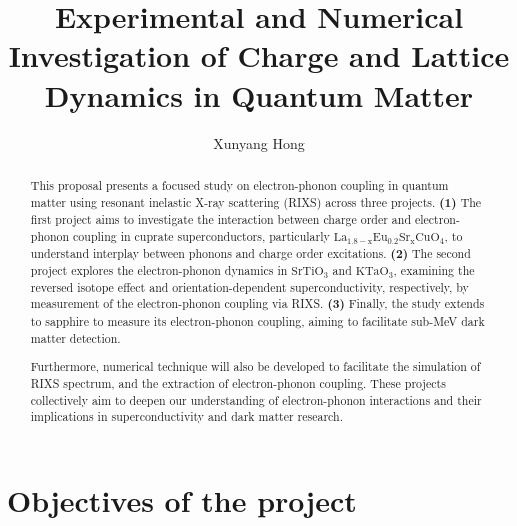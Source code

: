 \documentclass[11pt]{article}
\begin{document}
\title{Experimental and Numerical Investigation of Charge and Lattice Dynamics in Quantum Matter}
\author{Xunyang Hong}
\date{}
\maketitle





\begin{abstract}
This proposal presents a focused study on electron-phonon coupling in quantum matter using resonant inelastic X-ray scattering (RIXS) across three projects. \textbf{(1)} The first project aims to investigate the interaction between charge order and electron-phonon coupling in cuprate superconductors, particularly $\mathrm{La_{1.8-x}Eu_{0.2}Sr_xCuO_{4}}$, to understand interplay between phonons and charge order excitations. \textbf{(2)} The second project explores the electron-phonon dynamics in $\mathrm{SrTiO_{3}}$ and $\mathrm{KTaO_{3}}$, examining the reversed isotope effect and orientation-dependent superconductivity, respectively, by measurement of the electron-phonon coupling via RIXS. \textbf{(3)} Finally, the study extends to sapphire to measure its electron-phonon coupling, aiming to facilitate sub-MeV dark matter detection.

Furthermore, numerical technique will also be developed to facilitate the simulation of RIXS spectrum, and the extraction of electron-phonon coupling. These projects collectively aim to deepen our understanding of electron-phonon interactions and their implications in superconductivity and dark matter research.
\end{abstract}

\section{Objectives of the project}

\end{document}
